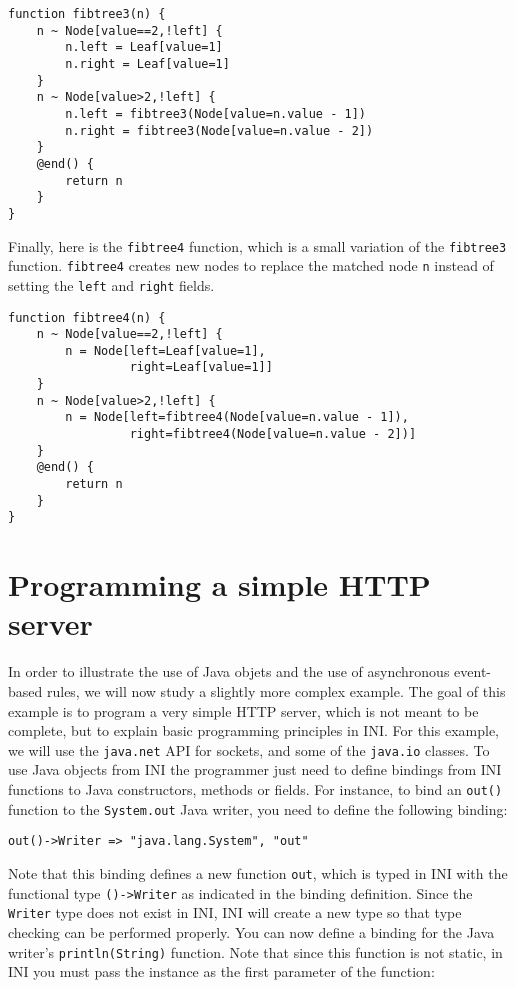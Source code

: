 \documentclass[11pt]{report}
\begin{document}
\begin{lstlisting}
function fibtree3(n) {
	n ~ Node[value==2,!left] {
		n.left = Leaf[value=1]
		n.right = Leaf[value=1]
	}
	n ~ Node[value>2,!left] {
		n.left = fibtree3(Node[value=n.value - 1])
		n.right = fibtree3(Node[value=n.value - 2])
	}
	@end() {
		return n
	}
}
\end{lstlisting}

Finally, here is the \texttt{fibtree4} function, which is a small variation of the \texttt{fibtree3} function. \texttt{fibtree4} creates new nodes to replace the matched node \texttt{n} instead of setting the \texttt{left} and \texttt{right} fields.

\begin{lstlisting}
function fibtree4(n) {
	n ~ Node[value==2,!left] {
		n = Node[left=Leaf[value=1],
		         right=Leaf[value=1]]
	}
	n ~ Node[value>2,!left] {
		n = Node[left=fibtree4(Node[value=n.value - 1]),
		         right=fibtree4(Node[value=n.value - 2])]
	}
	@end() {
		return n
	}
}
\end{lstlisting}

\section{Programming a simple HTTP server}

In order to illustrate the use of Java objets and the use of asynchronous event-based rules, we will now study a slightly more complex example. The goal of this example is to program a very simple HTTP server, which is not meant to be complete, but to explain basic programming principles in INI. For this example, we will use the \texttt{java.net} API for sockets, and some of the \texttt{java.io} classes. To use Java objects from INI the programmer just need to define bindings from INI functions to Java constructors, methods or fields. For instance, to bind an \texttt{out()} function to the \texttt{System.out} Java writer, you need to define the following binding:

\begin{lstlisting}[numbers=none]
out()->Writer => "java.lang.System", "out"
\end{lstlisting}

Note that this binding defines a new function \texttt{out}, which is typed in INI with the functional type \texttt{()->Writer} as indicated in the binding definition. Since the \texttt{Writer} type does not exist in INI, INI will create a new type so that type checking can be performed properly. You can now define a binding for the Java writer's \texttt{println(String)} function. Note that since this function is not static, in INI you must pass the instance as the first parameter of the function:
\end{document}
